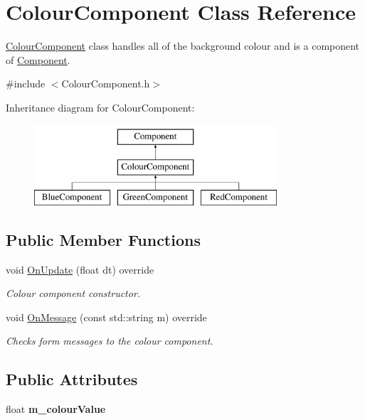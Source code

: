 \hypertarget{class_colour_component}{}\section{Colour\+Component Class Reference}
\label{class_colour_component}


\mbox{\hyperlink{class_colour_component}{Colour\+Component}} class handles all of the background colour and is a component of \mbox{\hyperlink{class_component}{Component}}.  




{\ttfamily \#include $<$Colour\+Component.\+h$>$}

Inheritance diagram for Colour\+Component\+:\begin{figure}[H]
\begin{center}
\leavevmode
\includegraphics[height=3.000000cm]{class_colour_component}
\end{center}
\end{figure}
\subsection*{Public Member Functions}
\begin{DoxyCompactItemize}
\item 
void \mbox{\hyperlink{class_colour_component_ae45e91aebb680031bb1328c7c189ea15}{On\+Update}} (float dt) override
\begin{DoxyCompactList}\small\item\em Colour component constructor. \end{DoxyCompactList}\item 
void \mbox{\hyperlink{class_colour_component_a40b859f0c124ddbe92ff1e53bdb398a0}{On\+Message}} (const std\+::string m) override
\begin{DoxyCompactList}\small\item\em Checks form messages to the colour component. \end{DoxyCompactList}\end{DoxyCompactItemize}
\subsection*{Public Attributes}
\begin{DoxyCompactItemize}
\item 
\mbox{\label{class_colour_component_a58d3b68b7fdbf8acc74c043a05371216}} 
float {\bfseries m\+\_\+colour\+Value}
\end{DoxyCompactItemize}


